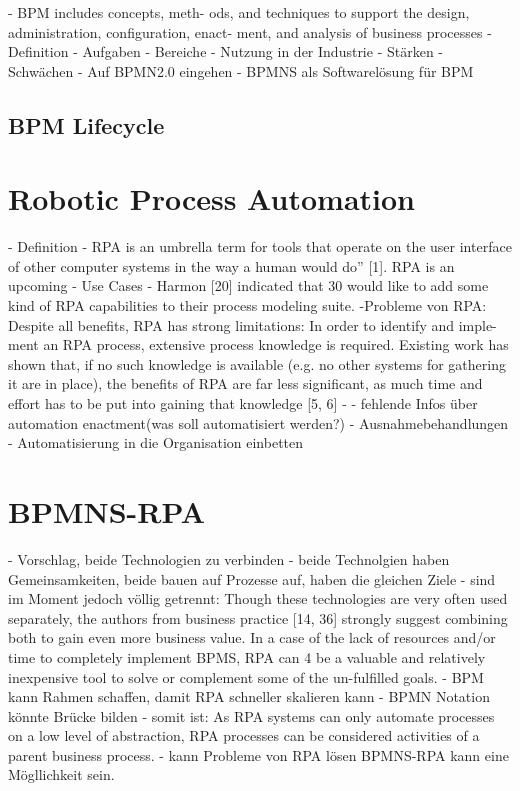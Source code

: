    - BPM includes concepts, meth-
ods, and techniques to support the design, administration, conﬁguration, enact-
ment, and analysis of business processes
- Definition
- Aufgaben
- Bereiche
- Nutzung in der Industrie
- Stärken
- Schwächen
- Auf BPMN2.0 eingehen
- BPMNS als Softwarelösung für BPM
\subsection{BPM Lifecycle}
    \section{Robotic Process Automation}
- Definition
- RPA is an umbrella term for tools that operate on
the user interface of other computer systems in the way a human would do” [1].
RPA is an upcoming
- Use Cases
- Harmon [20] indicated that 30%
would like to add some kind of RPA capabilities to their process modeling suite. 
-Probleme von RPA:
Despite all beneﬁts, RPA has strong limitations: In order to identify and imple-
ment an RPA process, extensive process knowledge is required. Existing work
has shown that, if no such knowledge is available (e.g. no other systems for
gathering it are in place), the beneﬁts of RPA are far less signiﬁcant, as much
time and eﬀort has to be put into gaining that knowledge [5, 6]
- - fehlende Infos über automation enactment(was soll automatisiert werden?)
- Ausnahmebehandlungen
- Automatisierung in die Organisation einbetten

    \section{BPMNS-RPA}
- Vorschlag, beide Technologien zu verbinden
- beide Technolgien haben Gemeinsamkeiten, beide bauen auf Prozesse auf, haben die gleichen Ziele
- sind im Moment jedoch völlig getrennt: Though these technologies are very often used separately, the authors from business practice [14, 36] strongly suggest combining both to gain even more business value. In a case of the lack of resources and/or time to completely implement BPMS, RPA can
4 be a valuable and relatively inexpensive tool to solve or complement some of the un-fulfilled goals.
- BPM kann Rahmen schaffen, damit RPA schneller skalieren kann
- BPMN Notation könnte Brücke bilden
- somit ist: As RPA systems can only automate processes on a low level
of abstraction, RPA processes can be considered activities of a parent business
process.
- kann Probleme von RPA lösen
BPMNS-RPA kann eine Mögllichkeit sein.
